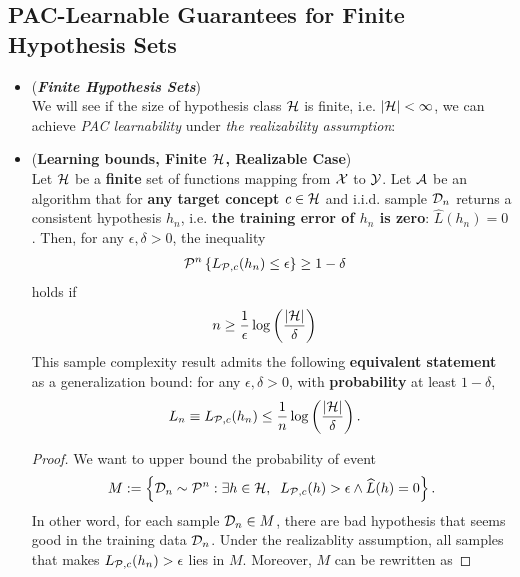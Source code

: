 \documentclass[11pt]{article}
\begin{document}
\subsection{PAC-Learnable Guarantees for Finite Hypothesis Sets}
\begin{itemize}
\item \begin{remark} (\emph{\textbf{Finite Hypothesis Sets}})\\
We will see if the size of hypothesis class ${\mathcal H}$ is finite, i.e. $\left\lvert {\mathcal H} \right\rvert < \infty$, we can achieve \emph{PAC learnability} under \emph{the realizability assumption}:
\end{remark}

\item \begin{proposition} (\textbf{Learning bounds, Finite ${\mathcal H}$, Realizable Case}) \citep{mohri2018foundations}\\
Let ${\mathcal H}$ be a \textbf{finite} set of functions mapping from ${\mathcal X}$ to ${\mathcal Y}$. Let ${\mathcal A}$ be an algorithm that for \textbf{any target concept $c \in {\mathcal H}$} and i.i.d. sample ${\mathcal D}_n$ returns a consistent hypothesis $h_n$, i.e. \textbf{the training error of $h_n$ is zero}: $\widehat{L}(h_n) = 0$.
Then, for any $\epsilon, \delta > 0$, the inequality 
\begin{align*}
{\mathcal P}^{n}\left\{ L_{{\mathcal P}, c}(h_n) \le \epsilon\right\} &\ge  1 - \delta
\end{align*} holds if
\begin{align}
n &\ge \frac{1}{\epsilon}\log\left(\frac{\left\lvert {\mathcal H} \right\rvert}{\delta}\right) \label{eqn: pac_sample_complexity_finite_case}
\end{align}
This sample complexity result admits the following \textbf{equivalent statement} as a generalization bound: for any $\epsilon, \delta > 0$, with \textbf{probability} at least $1 - \delta$,
\begin{align}
L_n \equiv L_{{\mathcal P}, c}(h_n) &\le \frac{1}{n}\log\left(\frac{\left\lvert {\mathcal H} \right\rvert}{\delta}\right). \label{eqn: pac_sample_complexity_finite_case_consistency}
\end{align}
\end{proposition}
\begin{proof}
We want to upper bound the probability of event 
\begin{align*}
M := \left\{{\mathcal D}_n \sim {\mathcal P}^n: \exists h \in {\mathcal H}, \;\; L_{{\mathcal P}, c}(h) > \epsilon \land \widehat{L}(h) = 0\right\}.
\end{align*} In other word, for each sample ${\mathcal D}_n \in M$, there are bad hypothesis that seems good in the training data ${\mathcal D}_n$. Under the realizablity assumption, all samples that makes $ L_{{\mathcal P}, c}(h_n) > \epsilon$ lies in $M$. Moreover, $M$ can be rewritten as

\end{proof}
\end{itemize}
\end{document}
